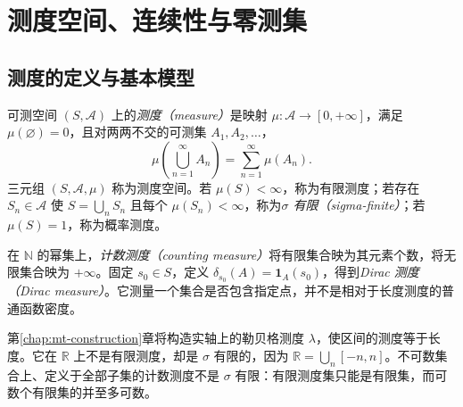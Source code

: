 \setcounter{chapter}{2} %
\chapter{测度空间、连续性与零测集}
\label{chap:mt-measures}

\section{测度的定义与基本模型}
\begin{definition}
可测空间 $(S,\mathcal A)$ 上的\emph{测度（measure）}是映射 $\mu:\mathcal A\to[0,+\infty]$，满足 $\mu(\varnothing)=0$，且对两两不交的可测集 $A_1,A_2,\ldots$，
\begin{equation}
 \mu\!\left(\bigcup_{n=1}^{\infty}A_n\right)=\sum_{n=1}^{\infty}\mu(A_n).
 \label{eq:mt-countable-additivity}
\end{equation}
三元组 $(S,\mathcal A,\mu)$ 称为测度空间。若 $\mu(S)<\infty$，称为有限测度；若存在 $S_n\in\mathcal A$ 使 $S=\bigcup_nS_n$ 且每个 $\mu(S_n)<\infty$，称为\emph{$\sigma$ 有限（sigma-finite）}；若 $\mu(S)=1$，称为概率测度。
\end{definition}

在 $\mathbb N$ 的幂集上，\emph{计数测度（counting measure）}将有限集合映为其元素个数，将无限集合映为 $+\infty$。固定 $s_0\in S$，定义 $\delta_{s_0}(A)=\mathbf1_A(s_0)$，得到\emph{Dirac 测度（Dirac measure）}。它测量一个集合是否包含指定点，并不是相对于长度测度的普通函数密度。

第\ref{chap:mt-construction}章将构造实轴上的勒贝格测度 $\lambda$，使区间的测度等于长度。它在 $\mathbb R$ 上不是有限测度，却是 $\sigma$ 有限的，因为 $\mathbb R=\bigcup_n[-n,n]$。不可数集合上、定义于全部子集的计数测度不是 $\sigma$ 有限：有限测度集只能是有限集，而可数个有限集的并至多可数。

